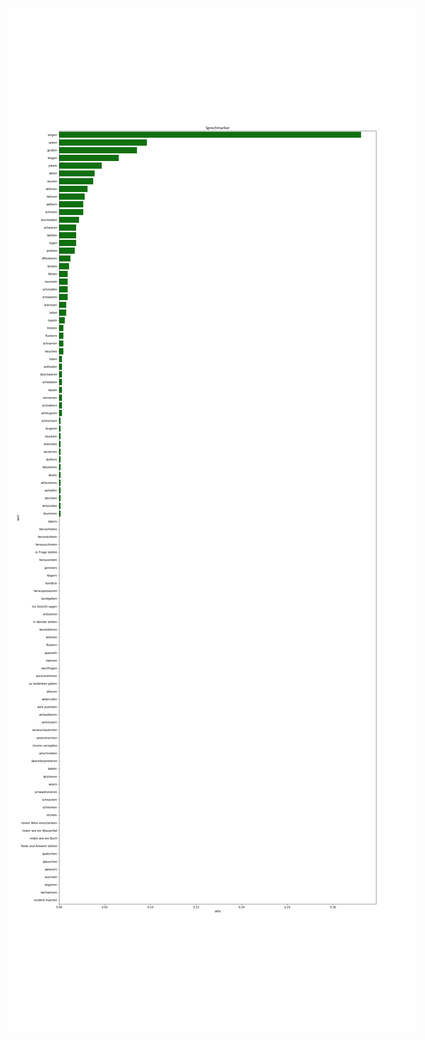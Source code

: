 \documentclass[a4paper,10p]{article}
\begin{document}
\begin{figure}{}
    \centering
    \begin{minipage}[b]{.45\linewidth}
        \centering
        \includegraphics[width=\linewidth]{autoren_sprechmarker_lang_pro_wort.png}

\end{minipage}
\end{figure}
\end{document}
